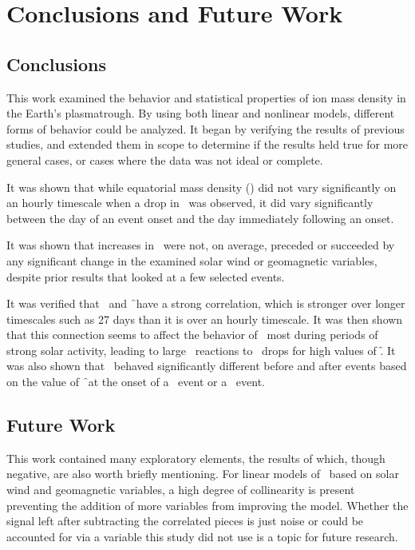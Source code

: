 \chapter[Conclusions and Future Work]{Conclusions and Future Work}

\section{Conclusions}
This work examined the behavior and statistical properties of ion mass density in the Earth's plasmatrough. By using both linear and nonlinear models, different forms of behavior could be analyzed. It began by verifying the results of previous studies, and extended them in scope to determine if the results held true for more general cases, or cases where the data was not ideal or complete. 

It was shown that while equatorial mass density (\req) did not vary significantly on an hourly timescale when a drop in \dst\ was observed, it did vary significantly between the day of an event onset and the day immediately following an onset.

It was shown that increases in \req\ were not, on average, preceded or succeeded by any significant change in the examined solar wind or geomagnetic variables, despite prior results that looked at a few selected events. 

It was verified that \req\ and \f\ have a strong correlation, which is stronger over longer timescales such as 27 days than it is over an hourly timescale. It was then shown that this connection seems to affect the behavior of \req\ most during periods of strong solar activity, leading to large \req\ reactions to \dst\ drops for high values of \f.  It was also shown that \req\ behaved significantly different before and after events based on the value of \f\ at the onset of a \req\ event or a \dst\ event.  



\section{Future Work}

This work contained many exploratory elements, the results of which, though negative, are also worth briefly mentioning. For linear models of \req\ based on solar wind and geomagnetic variables, a high degree of collinearity is present preventing the addition of more variables from improving the model. Whether the signal left after subtracting the correlated pieces is just noise or could be accounted for via a variable this study did not use is a topic for future research.

